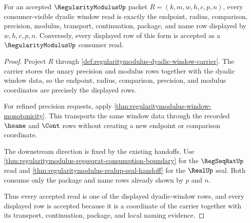 \begin{theorem}
\label{thm:regularitymodulus-dyadic-window-exactness}
For an accepted $\RegularityModulusUp$ packet
$R=(k,m,w,h,c,p,n)$, every consumer-visible dyadic window read is exactly the
endpoint, radius, comparison, precision, modulus, transport, continuation,
package, and name row displayed by $w,h,c,p,n$. Conversely, every displayed
row of this form is accepted as a $\RegularityModulusUp$ consumer read.
\end{theorem}
\begin{proof}
Project $R$ through
\autoref{def:regularitymodulus-dyadic-window-carrier}. The carrier stores the
unary precision and modulus rows together with the dyadic window data, so the
endpoint, radius, comparison, precision, and modulus coordinates are precisely
the displayed rows.

For refined precision requests, apply
\autoref{thm:regularitymodulus-window-monotonicity}. This transports the same
window data through the recorded $\hsame$ and $\Cont$ rows without creating a
new endpoint or comparison coordinate.

The downstream direction is fixed by the existing handoffs. Use
\autoref{thm:regularitymodulus-regseqrat-consumption-boundary} for the
$\RegSeqRatUp$ read and
\autoref{thm:regularitymodulus-realup-seal-handoff} for the $\RealUp$ seal.
Both consume only the package and name rows already shown by $p$ and $n$.

Thus every accepted read is one of the displayed dyadic-window rows, and every
displayed row is accepted because it is a coordinate of the carrier together
with its transport, continuation, package, and local naming evidence.
\end{proof}

